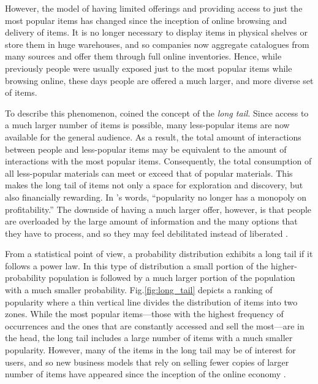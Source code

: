 However, the model of having limited offerings and providing access to just the most popular items has changed since the inception of online browsing and delivery of items. 
It is no longer necessary to display items in physical shelves or store them in huge warehouses, and so companies now aggregate catalogues from many sources and offer them through full online inventories. 
Hence, while previously people were usually exposed just to the most popular items while browsing online, these days people are offered a much larger, and more diverse set of items. 


To describe this phenomenon, \textcite{anderson04long} coined the concept of the \emph{long tail}. Since access to a much larger number of items is possible, many less-popular items are now available for the general audience. As a result, the total amount of interactions between people and less-popular items may be equivalent to the amount of interactions with the most popular items. Consequently, the total consumption of all less-popular materials can meet or exceed that of popular materials. 
This makes the long tail of items not only a space for exploration and discovery, but also financially rewarding. In \citeauthor{anderson04long}'s words, ``popularity no longer has a monopoly on profitability.''
The downside of having a much larger offer, however, is that people are overloaded by the large amount of information and the many options that they have to process, and so they may feel debilitated instead of liberated \autocite{schwartz04paradox}. 


From a statistical point of view, a probability distribution exhibits a long tail if it follows a power law. In this type of distribution a small portion of the higher-probability population is followed by a much larger portion of the population with a much smaller probability.
Fig.\ref{fig:long_tail} depicts a ranking of popularity where a thin vertical line divides the distribution of items into two zones. While the most popular items---those with the highest frequency of occurrences and the ones that are constantly accessed and sell the most---are in the head, the long tail includes a large number of items with a much smaller popularity. 
However, many of the items in the long tail may be of interest for users, and so new business models that rely on selling fewer copies of larger number of items have appeared since the inception of the online economy \autocite{anderson08long}. 


